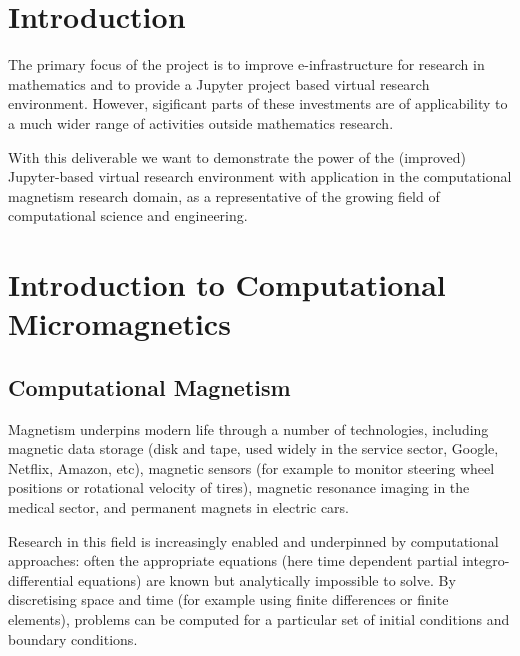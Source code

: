 \documentclass{deliverablereport}
\author{Marijan Beg and Hans Fangohr}
\begin{document}
\maketitle
\githubissuedescription
\newpage
\tableofcontents
\newpage

\section{Introduction}
The primary focus of the \ODK project is to improve e-infrastructure for research in mathematics and to provide a Jupyter project based virtual research environment. However, sigificant parts of these investments are of applicability to a much wider range of activities outside mathematics research.

With this deliverable we want to demonstrate the power of the (improved) Jupyter-based virtual research environment with application in the computational magnetism research domain, as a representative of the growing field of computational science and engineering.


\section{Introduction to Computational Micromagnetics}
\subsection{Computational Magnetism}

Magnetism underpins modern life through a number of technologies,
including magnetic data storage (disk and tape, used widely in the
service sector, Google, Netflix, Amazon, etc), magnetic sensors (for
example to monitor steering wheel positions or rotational velocity of
tires), magnetic resonance imaging in the medical sector, and
permanent magnets in electric cars.

Research in this field is increasingly enabled and underpinned by
computational approaches: often the appropriate equations (here time
dependent partial integro-differential equations) are known but
analytically impossible to solve. By discretising space and time (for
example using finite differences or finite elements), problems can be
computed for a particular set of initial conditions and boundary
conditions.
\end{document}
